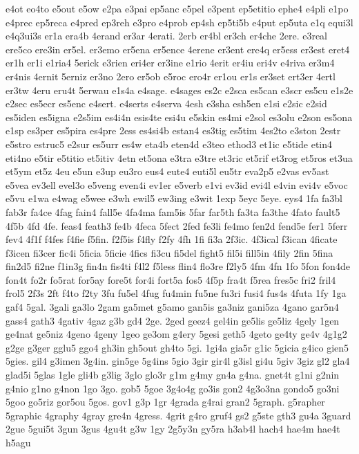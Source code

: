 {e4ot
eo4to
e5out
e5ow
e2pa
e3pai
ep5anc
e5pel
e3pent
ep5etitio
ephe4
e4pli
e1po
e4prec
ep5reca
e4pred
ep3reh
e3pro
e4prob
ep4sh
ep5ti5b
e4put
ep5uta
e1q
equi3l
e4q3ui3s
er1a
era4b
4erand
er3ar
4erati.
2erb
er4bl
er3ch
er4che
2ere.
e3real
ere5co
ere3in
er5el.
er3emo
er5ena
er5ence
4erene
er3ent
ere4q
er5ess
er3est
eret4
er1h
er1i
e1ria4
5erick
e3rien
eri4er
er3ine
e1rio
4erit
er4iu
eri4v
e4riva
er3m4
er4nis
4ernit
5erniz
er3no
2ero
er5ob
e5roc
ero4r
er1ou
er1s
er3set
ert3er
4ertl
er3tw
4eru
eru4t
5erwau
e1s4a
e4sage.
e4sages
es2c
e2sca
es5can
e3scr
es5cu
e1s2e
e2sec
es5ecr
es5enc
e4sert.
e4serts
e4serva
4esh
e3sha
esh5en
e1si
e2sic
e2sid
es5iden
es5igna
e2s5im
es4i4n
esis4te
esi4u
e5skin
es4mi
e2sol
es3olu
e2son
es5ona
e1sp
es3per
es5pira
es4pre
2ess
es4si4b
estan4
es3tig
es5tim
4es2to
e3ston
2estr
e5stro
estruc5
e2sur
es5urr
es4w
eta4b
eten4d
e3teo
ethod3
et1ic
e5tide
etin4
eti4no
e5tir
e5titio
et5itiv
4etn
et5ona
e3tra
e3tre
et3ric
et5rif
et3rog
et5ros
et3ua
et5ym
et5z
4eu
e5un
e3up
eu3ro
eus4
eute4
euti5l
eu5tr
eva2p5
e2vas
ev5ast
e5vea
ev3ell
evel3o
e5veng
even4i
ev1er
e5verb
e1vi
ev3id
evi4l
e4vin
evi4v
e5voc
e5vu
e1wa
e4wag
e5wee
e3wh
ewil5
ew3ing
e3wit
1exp
5eyc
5eye.
eys4
1fa
fa3bl
fab3r
fa4ce
4fag
fain4
fall5e
4fa4ma
fam5is
5far
far5th
fa3ta
fa3the
4fato
fault5
4f5b
4fd
4fe.
feas4
feath3
fe4b
4feca
5fect
2fed
fe3li
fe4mo
fen2d
fend5e
fer1
5ferr
fev4
4f1f
f4fes
f4fie
f5fin.
f2f5is
f4fly
f2fy
4fh
1fi
fi3a
2f3ic.
4f3ical
f3ican
4ficate
f3icen
fi3cer
fic4i
5ficia
5ficie
4fics
fi3cu
fi5del
fight5
fil5i
fill5in
4fily
2fin
5fina
fin2d5
fi2ne
f1in3g
fin4n
fis4ti
f4l2
f5less
flin4
flo3re
f2ly5
4fm
4fn
1fo
5fon
fon4de
fon4t
fo2r
fo5rat
for5ay
fore5t
for4i
fort5a
fos5
4f5p
fra4t
f5rea
fres5c
fri2
fril4
frol5
2f3s
2ft
f4to
f2ty
3fu
fu5el
4fug
fu4min
fu5ne
fu3ri
fusi4
fus4s
4futa
1fy
1ga
gaf4
5gal.
3gali
ga3lo
2gam
ga5met
g5amo
gan5is
ga3niz
gani5za
4gano
gar5n4
gass4
gath3
4gativ
4gaz
g3b
gd4
2ge.
2ged
geez4
gel4in
ge5lis
ge5liz
4gely
1gen
ge4nat
ge5niz
4geno
4geny
1geo
ge3om
g4ery
5gesi
geth5
4geto
ge4ty
ge4v
4g1g2
g2ge
g3ger
gglu5
ggo4
gh3in
gh5out
gh4to
5gi.
1gi4a
gia5r
g1ic
5gicia
g4ico
gien5
5gies.
gil4
g3imen
3g4in.
gin5ge
5g4ins
5gio
3gir
gir4l
g3isl
gi4u
5giv
3giz
gl2
gla4
glad5i
5glas
1gle
gli4b
g3lig
3glo
glo3r
g1m
g4my
gn4a
g4na.
gnet4t
g1ni
g2nin
g4nio
g1no
g4non
1go
3go.
gob5
5goe
3g4o4g
go3is
gon2
4g3o3na
gondo5
go3ni
5goo
go5riz
gor5ou
5gos.
gov1
g3p
1gr
4grada
g4rai
gran2
5graph.
g5rapher
5graphic
4graphy
4gray
gre4n
4gress.
4grit
g4ro
gruf4
gs2
g5ste
gth3
gu4a
3guard
2gue
5gui5t
3gun
3gus
4gu4t
g3w
1gy
2g5y3n
gy5ra
h3ab4l
hach4
hae4m
hae4t
h5agu
}
